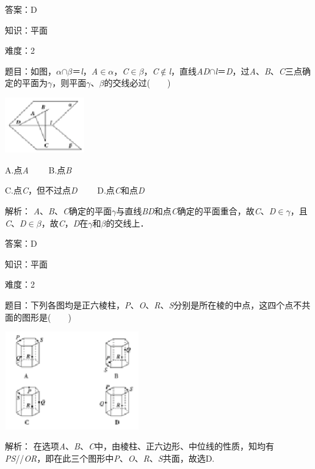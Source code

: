\documentclass{article} %
\begin{document}
答案：D

知识：平面

难度：2

题目：如图，\textit{$\alpha$}$\mathrm{\cap}$\textit{$\beta$}＝\textit{l}，\textit{A}$\mathrm{\in}$\textit{$\alpha$}，\textit{C}$\mathrm{\in}$\textit{$\beta$}，\textit{C}$\mathrm{\notin}$\textit{l}，直线\textit{AD}$\mathrm{\cap}$\textit{l}＝\textit{D}，过\textit{A}、\textit{B}、\textit{C}三点确定的平面为\textit{$\gamma$}，则平面\textit{$\gamma$}、\textit{$\beta$}的交线必过(　　)

\includegraphics*[width=1.35in, height=0.94in, keepaspectratio=false]{image94}

A.点\textit{A}　　  B.点\textit{B}

C.点\textit{C}，但不过点\textit{D}　　 D.点\textit{C}和点\textit{D}

解析：
\textit{A}、\textit{B}、\textit{C}确定的平面\textit{$\gamma$}与直线\textit{BD}和点\textit{C}确定的平面重合，故\textit{C}、\textit{D}$\mathrm{\in}$\textit{$\gamma$}，且\textit{C}、\textit{D}$\mathrm{\in}$\textit{$\beta$}，故\textit{C}，\textit{D}在\textit{$\gamma$}和\textit{$\beta$}的交线上．

答案：D

知识：平面

难度：2

题目：下列各图均是正六棱柱，\textit{P}、\textit{O}、\textit{R}、\textit{S}分别是所在棱的中点，这四个点不共面的图形是(　　)

\includegraphics*[width=2.29in, height=1.66in, keepaspectratio=false]{image95}

解析：
在选项\textit{A}、\textit{B}、\textit{C}中，由棱柱、正六边形、中位线的性质，知均有\textit{PS}//\textit{OR}，即在此三个图形中\textit{P}、\textit{O}、\textit{R}、\textit{S}共面，故选D.
\end{document}
